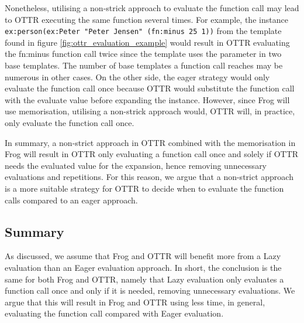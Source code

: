 \para 
Nonetheless, utilising a non-strick approach to evaluate the function call may lead to OTTR executing the same function several times. For example, the instance \lstinline{ex:person(ex:Peter "Peter Jensen" (fn:minus 25 1))} from the template found in figure \ref{fig:ottr_evaluation_example} would result in OTTR evaluating the fn:minus function call twice since the template uses the parameter in two base templates. The number of base templates a function call reaches may be numerous in other cases. On the other side, the eager strategy would only evaluate the function call once because OTTR would substitute the function call with the evaluate value before expanding the instance. However, since Frog will use memorisation, utilising a non-strick approach would, OTTR will, in practice, only evaluate the function call once.

\para
In summary, a non-strict approach in OTTR combined with the memorisation in Frog will result in OTTR only evaluating a function call once and solely if OTTR needs the evaluated value for the expansion, hence removing unnecessary evaluations and repetitions. For this reason, we argue that a non-strict approach is a more suitable strategy for OTTR to decide when to evaluate the function calls compared to an eager approach. 

\subsection{Summary}
As discussed, we assume that Frog and OTTR will benefit more from a Lazy evaluation than an Eager evaluation approach. In short, the conclusion is the same for both Frog and OTTR, namely that Lazy evaluation only evaluates a function call once and only if it is needed, removing unnecessary evaluations. We argue that this will result in Frog and OTTR using less time, in general, evaluating the function call compared with Eager evaluation. 
